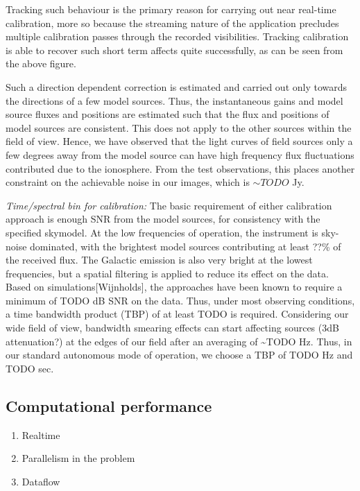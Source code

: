 \documentclass{aa}
\begin{document}
Tracking such  behaviour is the primary  reason for carrying  out near real-time
calibration, more so  because the streaming nature of  the application precludes
multiple  calibration   passes  through  the   recorded  visibilities.  Tracking
calibration is  able to recover such  short term affects  quite successfully, as
can be seen from the above figure.

Such a direction dependent correction  is estimated and carried out only towards
the directions of  a few model sources. Thus, the  instantaneous gains and model
source fluxes  and positions are estimated  such that the flux  and positions of
model sources  are consistent. This does  not apply to the  other sources within
the  field of  view. Hence,  we have  observed that  the light  curves  of field
sources only  a few degrees away from  the model source can  have high frequency
flux fluctuations contributed due to the ionosphere. From the test observations,
this places another  constraint on the achievable noise in  our images, which is
$\sim TODO$ Jy.

\emph{Time/spectral  bin  for  calibration:  }The basic  requirement  of  either
calibration approach is enough SNR  from the model sources, for consistency with
the specified skymodel.  At the low frequencies of  operation, the instrument is
sky-noise dominated, with the brightest model sources contributing at least ??\%
of the  received flux. The Galactic emission  is also very bright  at the lowest
frequencies, but  a spatial  filtering is  applied to reduce  its effect  on the
data.  Based on simulations{[}Wijnholds{]},  the approaches  have been  known to
require  a minimum  of  TODO dB  SNR on  the  data. Thus,  under most  observing
conditions,   a   time  bandwidth   product   (TBP)   of   at  least   TODO   is
required. Considering  our wide  field of view,  bandwidth smearing  effects can
start affecting  sources (3dB attenuation?) at  the edges of our  field after an
averaging of \textasciitilde{}TODO Hz. Thus,  in our standard autonomous mode of
operation, we choose a TBP of TODO Hz and TODO sec.


\subsection{\label{sub:Computational-performance}Computational performance}
\begin{enumerate}
\item{Realtime}
\item{Parallelism in the problem}
\item{Dataflow}
\end{enumerate}
\end{document}
